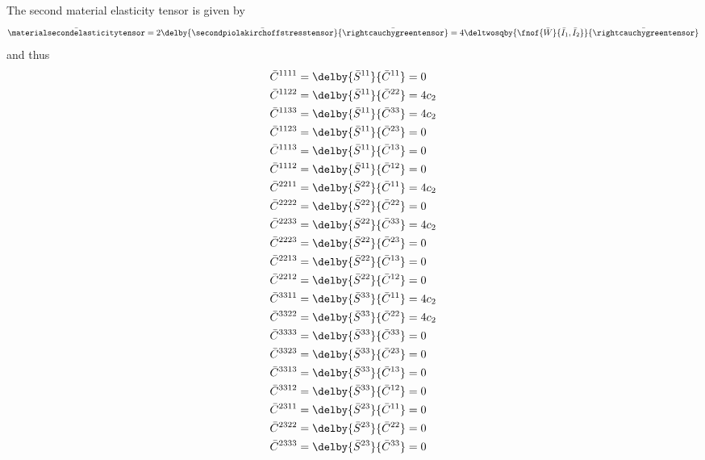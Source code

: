 The second material elasticity tensor is given by
\begin{equation}
  \bar{\materialsecondelasticitytensor}=2\delby{\bar{\secondpiolakirchoffstresstensor}}{\bar{\rightcauchygreentensor}}=4\deltwosqby{\fnof{\bar{W}}{\bar{I}_{1},\bar{I}_{2}}}{\bar{\rightcauchygreentensor}}\\
\end{equation}
and thus
\begin{equation}
  \begin{split}
    \bar{C}^{1111}&=\delby{\bar{S}^{11}}{\bar{C}^{11}}=0\\
    \bar{C}^{1122}&=\delby{\bar{S}^{11}}{\bar{C}^{22}}=4c_{2}\\
    \bar{C}^{1133}&=\delby{\bar{S}^{11}}{\bar{C}^{33}}=4c_{2}\\
    \bar{C}^{1123}&=\delby{\bar{S}^{11}}{\bar{C}^{23}}=0\\
    \bar{C}^{1113}&=\delby{\bar{S}^{11}}{\bar{C}^{13}}=0\\
    \bar{C}^{1112}&=\delby{\bar{S}^{11}}{\bar{C}^{12}}=0\\
    \bar{C}^{2211}&=\delby{\bar{S}^{22}}{\bar{C}^{11}}=4c_{2}\\
    \bar{C}^{2222}&=\delby{\bar{S}^{22}}{\bar{C}^{22}}=0\\
    \bar{C}^{2233}&=\delby{\bar{S}^{22}}{\bar{C}^{33}}=4c_{2}\\
    \bar{C}^{2223}&=\delby{\bar{S}^{22}}{\bar{C}^{23}}=0\\
    \bar{C}^{2213}&=\delby{\bar{S}^{22}}{\bar{C}^{13}}=0\\
    \bar{C}^{2212}&=\delby{\bar{S}^{22}}{\bar{C}^{12}}=0\\
    \bar{C}^{3311}&=\delby{\bar{S}^{33}}{\bar{C}^{11}}=4c_{2}\\
    \bar{C}^{3322}&=\delby{\bar{S}^{33}}{\bar{C}^{22}}=4c_{2}\\
    \bar{C}^{3333}&=\delby{\bar{S}^{33}}{\bar{C}^{33}}=0\\
    \bar{C}^{3323}&=\delby{\bar{S}^{33}}{\bar{C}^{23}}=0\\
    \bar{C}^{3313}&=\delby{\bar{S}^{33}}{\bar{C}^{13}}=0\\
    \bar{C}^{3312}&=\delby{\bar{S}^{33}}{\bar{C}^{12}}=0\\
    \bar{C}^{2311}&=\delby{\bar{S}^{23}}{\bar{C}^{11}}=0\\
    \bar{C}^{2322}&=\delby{\bar{S}^{23}}{\bar{C}^{22}}=0\\
    \bar{C}^{2333}&=\delby{\bar{S}^{23}}{\bar{C}^{33}}=0\\

\end{split}
\end{equation}
